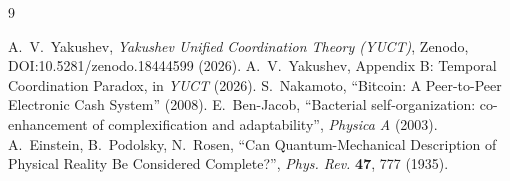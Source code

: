 \documentclass[11pt,a4paper]{article}
\begin{document}
	\begin{thebibliography}{9}
		\begin{otherlanguage}{english}
			 A.~V.~Yakushev, \emph{Yakushev Unified Coordination Theory (YUCT)}, Zenodo, DOI:10.5281/zenodo.18444599 (2026).
			 A.~V.~Yakushev, Appendix B: Temporal Coordination Paradox, in \emph{YUCT} (2026).
			 S.~Nakamoto, ``Bitcoin: A Peer-to-Peer Electronic Cash System'' (2008).
			 E.~Ben-Jacob, ``Bacterial self-organization: co-enhancement of complexification and adaptability'', \emph{Physica A} (2003).
			 A.~Einstein, B.~Podolsky, N.~Rosen, ``Can Quantum-Mechanical Description of Physical Reality Be Considered Complete?'', \emph{Phys. Rev.} \textbf{47}, 777 (1935).
		\end{otherlanguage}
	\end{thebibliography}
	
\end{document}
